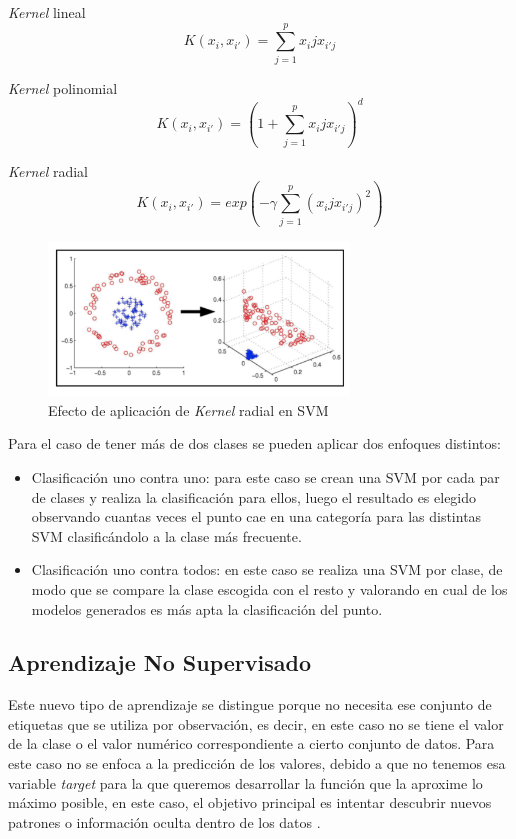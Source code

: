 \textit{Kernel} lineal
\begin{equation}
    K(x_i, x_{i'}) = \sum_{j=1}^{p} x_ij x_{i'j}
\end{equation}

\textit{Kernel} polinomial
\begin{equation}
    K(x_i, x_{i'}) = (1 + \sum_{j=1}^{p} x_ij x_{i'j})^d
\end{equation}

\textit{Kernel} radial
\begin{equation}
    K(x_i, x_{i'}) = exp(-\gamma \sum_{j=1}^{p} (x_ij x_{i'j})^2)
\end{equation}

\begin{figure}[H]
    \centering
    \includegraphics[width=8cm]{figs/svm_radial.png}
    \caption{Efecto de aplicación de \textit{Kernel} radial en SVM}
    \label{fig:svm_radial}
\end{figure}

Para el caso de tener más de dos clases se pueden aplicar dos enfoques distintos:

\begin{itemize}
    \item Clasificación uno contra uno: para este caso se crean una SVM por cada par de clases y realiza la clasificación para ellos, luego el resultado es elegido observando cuantas veces el punto cae en una categoría para las distintas SVM clasificándolo a la clase más frecuente.
    \item Clasificación uno contra todos: en este caso se realiza una SVM por clase, de modo que se compare la clase escogida con el resto y valorando en cual de los modelos generados es más apta la clasificación del punto.
\end{itemize}

\subsection{Aprendizaje No Supervisado}

Este nuevo tipo de aprendizaje se distingue porque no necesita ese conjunto de etiquetas que se utiliza por observación, es decir, en este caso no se tiene el valor de la clase o el valor numérico correspondiente a cierto conjunto de datos. Para este caso no se enfoca a la predicción de los valores, debido a que no tenemos esa variable \textit{target} para la que queremos desarrollar la función que la aproxime lo máximo posible, en este caso, el objetivo principal es intentar descubrir nuevos patrones o información oculta dentro de los datos \cite{james2013introduction}.

